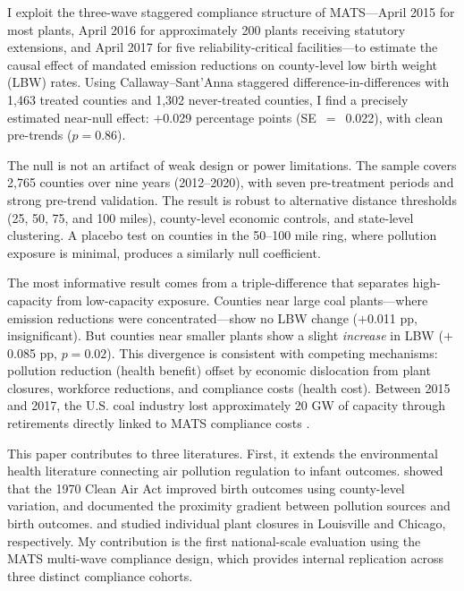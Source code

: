 \documentclass[12pt]{article}
\begin{document}
I exploit the three-wave staggered compliance structure of MATS---April 2015 for most plants, April 2016 for approximately 200 plants receiving statutory extensions, and April 2017 for five reliability-critical facilities---to estimate the causal effect of mandated emission reductions on county-level low birth weight (LBW) rates. Using Callaway--Sant'Anna staggered difference-in-differences with 1,463 treated counties and 1,302 never-treated counties, I find a precisely estimated near-null effect: $+$0.029 percentage points (SE~$=$~0.022), with clean pre-trends ($p = 0.86$).

The null is not an artifact of weak design or power limitations. The sample covers 2,765 counties over nine years (2012--2020), with seven pre-treatment periods and strong pre-trend validation. The result is robust to alternative distance thresholds (25, 50, 75, and 100 miles), county-level economic controls, and state-level clustering. A placebo test on counties in the 50--100 mile ring, where pollution exposure is minimal, produces a similarly null coefficient.

The most informative result comes from a triple-difference that separates high-capacity from low-capacity exposure. Counties near large coal plants---where emission reductions were concentrated---show no LBW change ($+$0.011 pp, insignificant). But counties near smaller plants show a slight \textit{increase} in LBW ($+$0.085 pp, $p = 0.02$). This divergence is consistent with competing mechanisms: pollution reduction (health benefit) offset by economic dislocation from plant closures, workforce reductions, and compliance costs (health cost). Between 2015 and 2017, the U.S. coal industry lost approximately 20 GW of capacity through retirements directly linked to MATS compliance costs \citep{eia2016mats}.

This paper contributes to three literatures. First, it extends the environmental health literature connecting air pollution regulation to infant outcomes. \citet{isen2017every} showed that the 1970 Clean Air Act improved birth outcomes using county-level variation, and \citet{currie2014environmental} documented the proximity gradient between pollution sources and birth outcomes. \citet{casey2018coal} and \citet{komisarow2022coal} studied individual plant closures in Louisville and Chicago, respectively. My contribution is the first national-scale evaluation using the MATS multi-wave compliance design, which provides internal replication across three distinct compliance cohorts.
\end{document}
